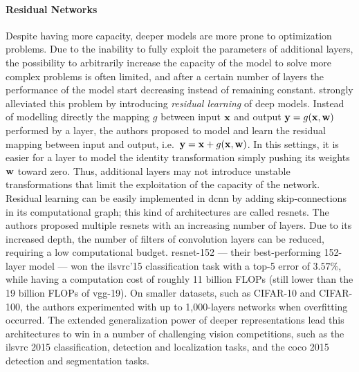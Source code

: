 \paragraph{Residual Networks}
Despite having more capacity, deeper models are more prone to optimization problems.
Due to the inability to fully exploit the parameters of additional layers, the possibility to arbitrarily increase the capacity of the model to solve more complex problems is often limited, and after a certain number of layers the performance of the model start decreasing instead of remaining constant.
\citet{he2016deep} strongly alleviated this problem by introducing \emph{residual learning} of deep models.
Instead of modelling directly the mapping $g$ between input $\mathbf{x}$ and output $\mathbf{y} = g(\mathbf{x}, \mathbf{w})$ performed by a layer, the authors proposed to model and learn the residual mapping between input and output, i.e.\ $\mathbf{y} = \mathbf{x} + g(\mathbf{x}, \mathbf{w})$.
In this settings, it is easier for a layer to model the identity transformation simply pushing its weights $\mathbf{w}$ toward zero.
Thus, additional layers may not introduce unstable transformations that limit the exploitation of the capacity of the network.
Residual learning can be easily implemented in \gls{dcnn} by adding skip-connections in its computational graph;
this kind of architectures are called \glspl{resnet}.
The authors proposed multiple \glspl{resnet} with an increasing number of layers.
Due to its increased depth, the number of filters of convolution layers can be reduced, requiring a low computational budget.
\gls{resnet}-152 --- their best-performing 152-layer model --- won the \gls{ilsvrc}'15 classification task with a top-5 error of $3.57 \%$, while having a computation cost of roughly 11 billion FLOPs (still lower than the 19 billion FLOPs of \gls{vgg}-19).
On smaller datasets, such as CIFAR-10 and CIFAR-100, the authors experimented with up to 1,000-layers networks when overfitting occurred.
The extended generalization power of deeper representations lead this architectures to win in a number of challenging vision competitions, such as the \gls{ilsvrc} 2015 classification, detection and localization tasks, and the \acrshort{coco} 2015 detection and segmentation tasks.

